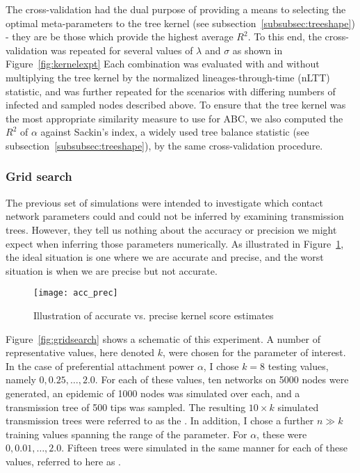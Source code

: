 The cross-validation had the dual purpose of providing a means to selecting the
optimal meta-parameters to the tree kernel (see
subsection~\ref{subsubsec:treeshape}) - they are be those which provide the
highest average $R^2$. To this end, the cross-validation was repeated for
several values of $\lambda$ and $\sigma$ as shown in Figure~\ref{fig:kernelexpt}
Each combination was evaluated with and without multiplying the tree kernel by
the normalized lineages-through-time (nLTT) statistic, and was further repeated
for the scenarios with differing numbers of infected and sampled nodes
described above. To ensure that the tree kernel was the most appropriate
similarity measure to use for ABC, we also computed the $R^2$ of $\alpha$
against Sackin's index, a widely used tree balance statistic (see
subsection~\ref{subsubsec:treeshape}), by the same cross-validation procedure.

\subsubsection{Grid search}

The previous set of simulations were intended to investigate which contact
network parameters could and could not be inferred by examining transmission
trees. However, they tell us nothing about the accuracy or precision we might
expect when inferring those parameters numerically. As illustrated in
Figure~\ref{fig:accprec}, the ideal situation is one where we are accurate and
precise, and the worst situation is when we are precise but not accurate.

\begin{figure}[ht]
  \centering
  \texttt{[image: acc\_prec]}
  \caption{Illustration of accurate vs. precise kernel score estimates}
  \label{fig:accprec}
\end{figure}

Figure~\ref{fig:gridsearch} shows a schematic of this experiment. A number of
representative values, here denoted $k$, were chosen for the parameter of
interest. In the case of preferential attachment power $\alpha$, I chose $k =
8$ testing values, namely $0, 0.25, \ldots, 2.0$. For each of these values, ten
networks on 5000 nodes were generated, an epidemic of 1000 nodes was simulated
over each, and a transmission tree of 500 tips was sampled. The resulting $10
\times k$ simulated transmission trees were referred to as the . In addition, I chose a further $n \gg k$ training values spanning the
range of the parameter. For $\alpha$, these were $0, 0.01, \ldots, 2.0$.
Fifteen trees were simulated in the same manner for each of these values,
referred to here as .

